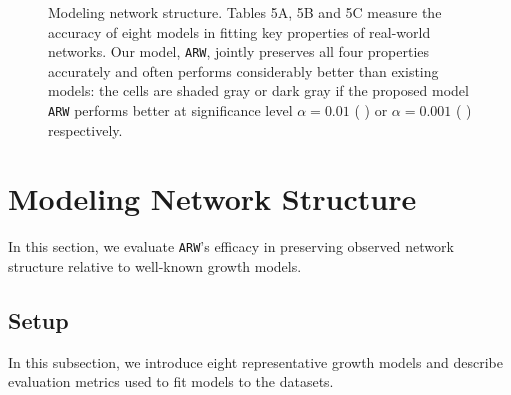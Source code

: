 
\begin{figure*}[t]
	\vspace{-15pt}
	\centering
	\vspace{-16pt}
	\caption{
		Modeling network structure.
		Tables 5A, 5B and 5C
		measure the accuracy of eight models in fitting key properties of real-world networks.
		Our model, \texttt{ARW}, jointly preserves all four properties accurately and often
		performs considerably better than existing models:
		the cells are shaded gray or dark gray if the proposed model \texttt{ARW} performs
		better at significance level $\alpha=0.01$ ( \lightgraybg{ }) or $\alpha=0.001$ ( \darkgraybg{ })
		respectively.
	}
	\vspace{-13pt}
	\label{fig:exp_table}
\end{figure*}

\section{Modeling Network Structure}
\label{sec:Experiments}
In this section, we evaluate \texttt{ARW}'s efficacy in preserving
observed network structure relative to well-known growth models.

\subsection{Setup}
\label{sub:Experimental Setup}

In this subsection, we introduce eight representative growth models
and describe evaluation metrics used to fit models to the datasets.

